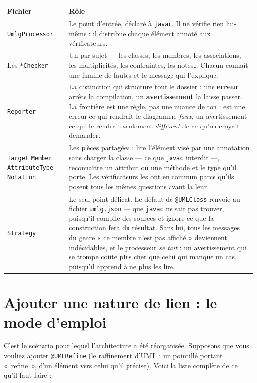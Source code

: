 \documentclass[12pt, a4paper]{article}
\begin{document}
\begin{longtable}{L{4.2cm} L{10cm}}
\toprule
\textbf{Fichier} & \textbf{Rôle} \\
\midrule
\endhead
\texttt{UmlgProcessor} &
Le point d'entrée, déclaré à \texttt{javac}. Il ne vérifie rien lui-même : il distribue chaque
élément annoté aux vérificateurs. \\
\addlinespace
Les \texttt{*Checker} &
Un par sujet — les classes, les membres, les associations, les multiplicités, les contraintes,
les notes… Chacun connaît une famille de fautes et le message qui l'explique. \\
\addlinespace
\texttt{Reporter} &
La distinction qui structure tout le dossier : une \textbf{erreur} arrête la compilation, un
\textbf{avertissement} la laisse passer. La frontière est une règle, pas une nuance de ton :
est une erreur ce qui rendrait le diagramme \emph{faux}, un avertissement ce qui le rendrait
seulement \emph{différent} de ce qu'on croyait demander. \\
\addlinespace
\texttt{Target} \newline \texttt{Member} \newline \texttt{AttributeType} \newline
\texttt{Notation} &
Les pièces partagées : lire l'élément visé par une annotation sans charger la classe — ce que
\texttt{javac} interdit —, reconnaître un attribut ou une méthode et le type qu'il porte. Les
vérificateurs les ont en commun parce qu'ils posent tous les mêmes questions avant la leur. \\
\addlinespace
\texttt{Strategy} &
Le seul point délicat. Le défaut de \texttt{@UMLClass} renvoie au fichier \texttt{umlg.json} —
que \texttt{javac} ne sait pas trouver, puisqu'il compile des sources et ignore ce que la
construction fera du résultat. Sans lui, tous les messages du genre « ce membre n'est pas
affiché » deviennent indécidables, et le processeur \emph{se tait} : un avertissement qui se
trompe coûte plus cher que celui qui manque un cas, puisqu'il apprend à ne plus les lire. \\
\bottomrule
\end{longtable}

\section{Ajouter une nature de lien : le mode d'emploi}
\label{sec:croissance}

C'est le scénario pour lequel l'architecture a été réorganisée. Supposons que vous vouliez
ajouter \texttt{@UMLRefine} (le raffinement d'UML : un pointillé portant «~refine~», d'un
élément vers celui qu'il précise). Voici la liste complète de ce qu'il faut faire :
\end{document}
